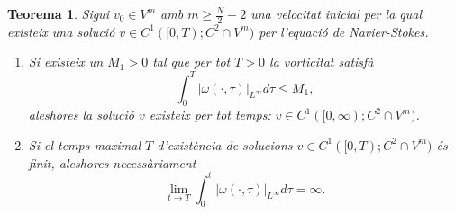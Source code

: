 \documentclass{article}
\numberwithin{equation}{section}
\newtheorem{teorema}{Teorema}[section]
\begin{document}
\begin{teorema}\label{Teo: existencia global}
Sigui $v_0\in V^m$ amb $m\geq\frac{N}{2}+2$ una velocitat inicial per la qual existeix una soluci\'{o} $v\in C^1([0,T);C^2\cap V^m)$ per l'equaci\'{o} de Navier-Stokes.
\begin{enumerate}
\item Si existeix un $M_1>0$ tal que per tot $T>0$ la vorticitat satisf\`{a}
\begin{equation}
\int_0^T|\omega(\cdot,\tau)|_{L^{\infty}}d\tau\leq M_1,
\end{equation}
aleshores la soluci\'{o} $v$ existeix per tot temps: $v\in C^1([0,\infty);C^2\cap V^m)$.
\item Si el temps maximal $T$ d'exist\`{e}ncia de solucions $v\in C^1([0,T);C^2\cap V^m)$ \'{e}s finit, aleshores necess\`{a}riament
\[\lim_{t\to T}\int_0^t|\omega(\cdot,\tau)|_{L^{\infty}}d\tau=\infty.\]
\end{enumerate}
\end{teorema}
\end{document}
